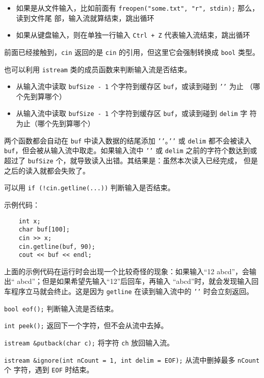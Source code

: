 \documentclass[UTF8]{ctexart}
\begin{document}
\begin{itemize}
    \item 如果是从文件输入，比如前面有 \texttt{freopen("some.txt", "r", stdin);} 那么，读到文件尾
    部，输入流就算结束，跳出循环
    \item 如果从键盘输入，则在单独一行输入 \texttt{Ctrl + Z} 代表输入流结束，跳出循环
\end{itemize}

前面已经接触到，\texttt{cin} 返回的是 \texttt{cin} 的引用，但这里它会强制转换成 \texttt{bool} 类型。

也可以利用 \texttt{istream} 类的成员函数来判断输入流是否结束。

\begin{itemize}
    \item {}
    从输入流中读取 \texttt{bufSize - 1} 个字符到缓存区 \texttt{buf}，或读到碰到 \texttt{'\n'} 为止
    （哪个先到算哪个）
    \item {}
    从输入流中读取 \texttt{bufSize - 1} 个字符到缓存区 \texttt{buf}，或读到碰到 \texttt{delim} 字
    符为止（哪个先到算哪个）
\end{itemize}
两个函数都会自动在 \texttt{buf} 中读入数据的结尾添加 \texttt{'\0'}。\texttt{'\n'} 或
\texttt{delim} 都不会被读入 \texttt{buf}，但会被从输入流中取走。如果输入流中 \texttt{'\n'} 或
\texttt{delim} 之前的字符个数达到或超过了 \texttt{bufSize} 个，就导致读入出错。其结果是：虽然本次读入已经完成，
但是之后的读入就都会失败了。

可以用 \texttt{if (!cin.getline(...))} 判断输入是否结束。

示例代码：
\begin{verbatim}
    int x;
    char buf[100];
    cin >> x;
    cin.getline(buf, 90);
    cout << buf << endl;
\end{verbatim}

上面的示例代码在运行时会出现一个比较奇怪的现象：如果输入“12 abcd”，会输出“ abcd”；但是如果希望先输入“12”后回车，再输入
“abcd”时，就会发现输入回车程序立马就会终止。这是因为 \texttt{getline} 在读到输入流中的 \texttt{'\n'}
时会立刻返回。

\texttt{bool eof();} 判断输入流是否结束。

\texttt{int peek();} 返回下一个字符，但不会从流中去掉。

\texttt{istream &putback(char c);} 将字符 \texttt{ch} 放回输入流。

\texttt{istream &ignore(int nCount = 1, int delim = EOF);} 从流中删掉最多 \texttt{nCount} 个
字符，遇到 \texttt{EOF} 时结束。
\end{document}
